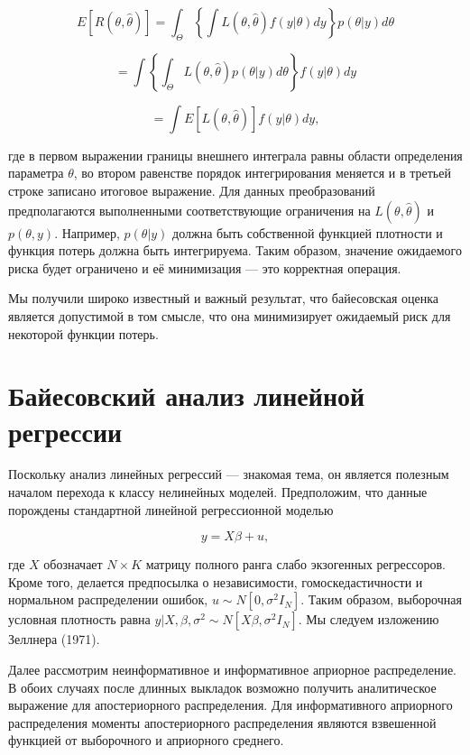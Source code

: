 \begin{equation}
E[R(\theta,\hat{\theta})]=\int_{\Theta}\left\lbrace\int{L}(\theta,\hat{\theta})f(y|\theta)dy \right\rbrace{p}(\theta|y)d\theta
\end{equation}

\[
=\int{ \left\lbrace\int_{\Theta}L(\theta,\hat{\theta})p(\theta|y)d\theta\right\rbrace}f(y|\theta)dy
\]

\[
=\int{E[L(\theta,\hat{\theta})]f(y|\theta)dy},
\]

где в первом выражении границы внешнего интеграла равны области определения параметра $\theta$, во втором равенстве порядок интегрирования меняется и в третьей строке записано итоговое выражение. Для данных преобразований предполагаются выполненными соответствующие  ограничения на $L(\theta,\hat{\theta})$ и $p(\theta,y)$. Например, $p(\theta|y)$ должна быть собственной функцией плотности и функция потерь должна быть интегрируема. Таким образом, значение ожидаемого риска будет ограничено и её минимизация --- это корректная операция.

Мы получили широко известный и важный результат, что байесовская оценка является допустимой в том смысле, что она минимизирует  ожидаемый риск для некоторой функции потерь.

\section{Байесовский анализ линейной регрессии}

Поскольку анализ линейных регрессий --- знакомая тема, он является полезным началом перехода к классу нелинейных моделей. Предположим, что данные порождены стандартной линейной регрессионной моделью

\[
y=X\beta+u,
\]

где $X$ обозначает $N \times K$ матрицу полного ранга слабо экзогенных регрессоров. Кроме того, делается предпосылка о независимости, гомоскедастичности и нормальном распределении ошибок, $u \sim N[0,\sigma^{2}I_{N}]$. Таким образом, выборочная условная плотность равна $y|X, \beta, \sigma^{2} \sim N[X\beta,\sigma^{2}I_{N}]$. Мы следуем изложению Зеллнера (1971).

Далее рассмотрим  неинформативное и информативное априорное распределение. В обоих случаях после длинных выкладок возможно получить аналитическое выражение для апостериорного распределения. Для информативного  априорного распределения моменты апостериорного распределения являются взвешенной функцией от выборочного и априорного среднего.

